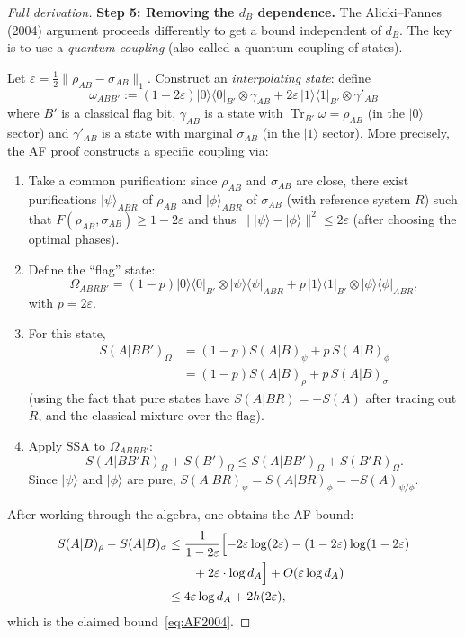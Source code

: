 \documentclass[12pt,a4paper]{article}
\DeclareMathOperator{\Tr}{Tr}
\begin{document}
\begin{proof}[Full derivation]
\medskip
\noindent\textbf{Step 5: Removing the $d_B$ dependence.}
The Alicki--Fannes (2004) argument proceeds differently to get a bound
independent of $d_B$.  The key is to use a \emph{quantum coupling} (also
called a quantum coupling of states).

Let $\varepsilon=\frac{1}{2}\|\rho_{AB}-\sigma_{AB}\|_1$.  Construct an
\emph{interpolating state}: define
\[
  \omega_{ABB'} := (1-2\varepsilon)|0\rangle\langle 0|_{B'}
    \otimes \gamma_{AB} + 2\varepsilon\,|1\rangle\langle 1|_{B'}
    \otimes \gamma'_{AB}
\]
where $B'$ is a classical flag bit, $\gamma_{AB}$ is a state with
$\Tr_{B'}\omega=\rho_{AB}$ (in the $|0\rangle$ sector) and
$\gamma'_{AB}$ is a state with marginal $\sigma_{AB}$ (in the $|1\rangle$
sector).  More precisely, the AF proof constructs a specific coupling via:

\begin{enumerate}
\item Take a common purification: since $\rho_{AB}$ and $\sigma_{AB}$ are
      close, there exist purifications $|\psi\rangle_{ABR}$ of $\rho_{AB}$ and
      $|\phi\rangle_{ABR}$ of $\sigma_{AB}$ (with reference system $R$) such
      that $F(\rho_{AB},\sigma_{AB})\geq 1-2\varepsilon$ and thus
      $\||\psi\rangle - |\phi\rangle\|^2 \leq 2\varepsilon$ (after choosing the
      optimal phases).

\item Define the ``flag'' state:
      \[
        \Omega_{ABRB'} = (1-p)|0\rangle\langle 0|_{B'}\otimes|\psi\rangle\langle\psi|_{ABR}
                        + p\,|1\rangle\langle 1|_{B'}\otimes|\phi\rangle\langle\phi|_{ABR},
      \]
      with $p=2\varepsilon$.

\item For this state,
      \begin{align*}
        S(A|BB')_\Omega
        &= (1-p)S(A|B)_\psi + p\,S(A|B)_\phi \\
        &= (1-p)S(A|B)_\rho + p\,S(A|B)_\sigma
      \end{align*}
      (using the fact that pure states have $S(A|BR)=-S(A)$ after tracing out $R$,
      and the classical mixture over the flag).

\item Apply SSA to $\Omega_{ABRB'}$:
      \[
        S(A|BB'R)_\Omega + S(B')_\Omega \leq S(A|BB')_\Omega + S(B'R)_\Omega.
      \]
      Since $|\psi\rangle$ and $|\phi\rangle$ are pure, $S(A|BR)_{\psi}=S(A|BR)_{\phi}=-S(A)_{\psi/\phi}$.
\end{enumerate}

After working through the algebra, one obtains the AF bound:
\begin{align*}
  S(A|B)_\rho - S(A|B)_\sigma
  &\leq \frac{1}{1-2\varepsilon}\Bigl[
      -2\varepsilon\log(2\varepsilon) - (1-2\varepsilon)\log(1-2\varepsilon) \\
      &\qquad + 2\varepsilon\cdot\log d_A
    \Bigr] + O(\varepsilon\log d_A) \\
  &\leq 4\varepsilon\log d_A + 2h(2\varepsilon),
\end{align*}
which is the claimed bound~\eqref{eq:AF2004}.
\end{proof}
\end{document}
